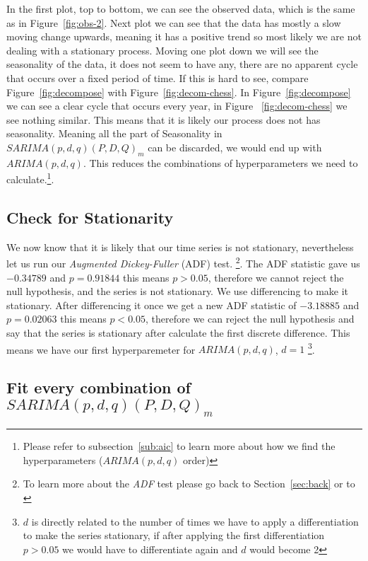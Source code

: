 \documentclass[journal]{IEEEtran}
\begin{document}
In the first plot, top to bottom, we can see the observed data, which is the
same as in Figure~\ref{fig:obs-2}. Next plot we can see that the data has
mostly a slow moving change upwards, meaning it has a positive trend so most
likely we are not dealing with a stationary process. Moving one plot down we
will see the seasonality of the data, it does not seem to have any, there are
no apparent cycle that occurs over a fixed period of time.  If this is hard to
see, compare Figure~\ref{fig:decompose} with Figure~\ref{fig:decom-chess}. In
Figure~\ref{fig:decompose} we can see a clear cycle that occurs every year, in
Figure ~\ref{fig:decom-chess} we see nothing similar. This means that it is
likely our process does not has seasonality. Meaning all the part of
Seasonality in $SARIMA(p,d,q)(P,D,Q)_m$ can be discarded, we would end up with
$ARIMA(p,d,q)$. This reduces the combinations of hyperparameters we need to
calculate.\footnote{Please refer to subsection~\ref{sub:aic} to learn more
about how we find the hyperparameters ($ARIMA(p,d,q)$ order)}.

\subsection{Check for Stationarity}

We now know that it is likely that our time series is not stationary,
nevertheless let us run our \emph{Augmented Dickey-Fuller} (ADF) test.
\footnote{To learn more about the \emph{ADF} test please go back to
Section~\ref{sec:back} or to \cite{adf}}. The ADF statistic gave us $-0.34789$
and $p = 0.91844$ this means $p > 0.05$, therefore we cannot reject the null
hypothesis, and the series is not stationary. We use differencing to make it
stationary. After differencing it once we get a new ADF statistic of
$-3.18885$ and $p = 0.02063$ this means $p < 0.05$, therefore we can reject
the null hypothesis and say that the series is stationary after calculate the
first discrete difference. This means we have our first hyperparemeter for
$ARIMA(p,d,q)$, $d = 1$ \footnote{$d$ is directly related to the number of
times we have to apply a differentiation to make the series stationary, if
after applying the first differentiation $p > 0.05$ we would have to
differentiate again and $d$ would become 2}.

\subsection{Fit every combination of $SARIMA(p,d,q)(P,D,Q)_m$}
\end{document}
